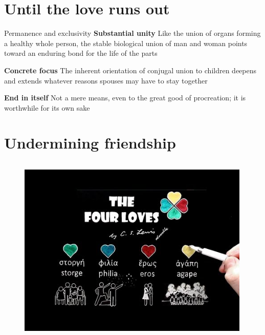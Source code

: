 \documentclass[xcolor=dvipsnames]{beamer}
\begin{document}
\section{Until the love runs out}


\begin{frame}{Permanence and exclusivity}
\textbf{Substantial unity}\newline
Like the union of organs forming a healthy whole person, the stable biological union of man and woman points toward an enduring bond for the life of the parts \vspace{10mm}

\textbf{Concrete focus}\newline
The inherent orientation of conjugal union to children deepens and extends whatever reasons spouses may have to stay together \vspace{10mm}

\textbf{End in itself}\newline
Not a mere means, even to the great good of procreation; it is worthwhile for its own sake \vspace{10mm}
\end{frame}


\section{Undermining friendship}


\begin{frame}[plain]
  \begin{columns}[T] %
    \begin{column}{0.9\textwidth}
      \begin{figure}[H]
        \centering
        \includegraphics[width=0.99\textwidth]{four-loves}
      \end{figure}
    \end{column}%
  \end{columns}
\end{frame}
\end{document}
